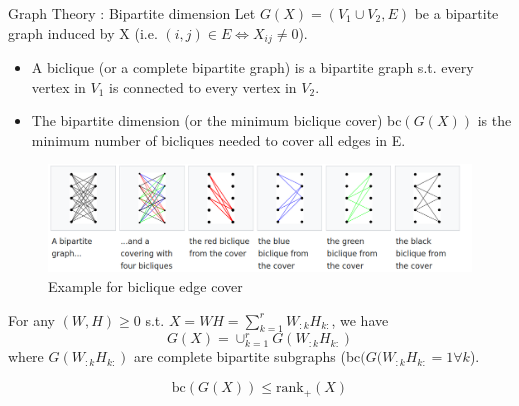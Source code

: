 \begin{frame}{Graph Theory : Bipartite dimension}
Let $G(X) = (V_1 \cup V_2, E)$ be a bipartite graph induced by X (i.e. $(i,j)\in E \Leftrightarrow X_{ij}\neq 0$).
\begin{defn}
\begin{itemize}
\item A biclique (or a complete bipartite graph) is a bipartite graph s.t. every vertex in $V_1$ is connected to every vertex in $V_2$. 
\item The bipartite dimension (or the minimum biclique cover) bc$(G(X))$ is the minimum number of bicliques needed to cover all edges in E.
\end{itemize} 
\end{defn}
\begin{figure}
\centering
\includegraphics[scale=0.18]{../images/biclique.png}
\caption{Example for biclique edge cover \cite{biclique}}
\end{figure}
\end{frame}

\begin{frame}
For any $(W,H)\geq 0$ s.t. $X = WH = \sum_{k=1}^r W_{:k}H_{k:}$, we have 
\[G(X) = \cup_{k=1}^r G(W_{:k}H_{k:})
\]
where $G(W_{:k}H_{k:})$ are complete bipartite subgraphs (bc$(G(W_{:k}H_{k:} = 1 \forall k$).

\begin{thm}
\[\text{bc}(G(X))\leq \text{rank}_+(X)
\]
\end{thm}
\end{frame}

